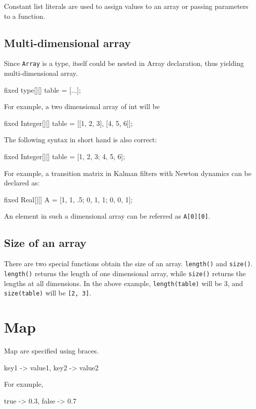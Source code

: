 \documentclass[12pt]{article}
\begin{document}
Constant list literals are used to assign values to an array or passing parameters to a function.

\subsection{Multi-dimensional array}
Since \texttt{Array} is a type, itself could be nested in Array declaration, thus yielding multi-dimensional array. 
\begin{blogcode}
fixed type[][] table = [...];
\end{blogcode}

For example, a two dimensional array of int will be
\begin{blogcode}
fixed Integer[][] table = [[1, 2, 3], [4, 5, 6]];
\end{blogcode}
The following syntax in short hand is also correct:
\begin{blogcode}
fixed Integer[][] table = [1, 2, 3; 4, 5, 6];
\end{blogcode}


For example, a transition matrix in Kalman  filters with Newton dynamics can be declared as:
\begin{blogcode}
fixed Real[][] A = [1, 1, .5; 0, 1, 1; 0, 0, 1];
\end{blogcode}
An element in such a dimensional array can be referred as \texttt{A[0][0]}.

\subsection{Size of an array}
There are two special functions obtain the size of an array.
\texttt{length(\mycdot)} and \texttt{size(\mycdot)}.
\texttt{length(\mycdot)} returns the length of one dimensional array, while \texttt{size(\mycdot)} returns the lengths at all dimensions.
In the above example, \texttt{length(table)} will be 3, and \texttt{size(table)} will be \texttt{[2, 3]}.

\section{Map}
Map are specified using braces. 
\begin{blogcode}
{key1 -> value1, key2 -> value2}
\end{blogcode}

For example, 
\begin{blogcode}
 {true -> 0.3, false -> 0.7}
\end{blogcode}
\end{document}
